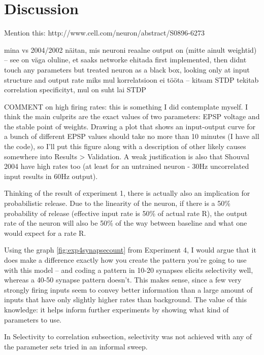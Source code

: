 \documentclass[a4paper,12pt]{report}
\theoremstyle{definition}
\begin{document}
\chapter{Discussion}
Mention this: http://www.cell.com/neuron/abstract/S0896-6273%

mina vs 2004/2002
näitan, mis neuroni reaalne output on (mitte ainult weightid) -- see on väga oluline, et saaks networke ehitada
first implemented, then didnt touch any parameters but treated neuron as a black box, looking only at input structure and output rate
miks mul korrelatsioon ei tööta -- kitsam STDP tekitab correlation specificityt, mul on suht lai STDP

COMMENT on high firing rates: this is something I did contemplate myself. I think the main culprits are the exact values of two parameters: EPSP voltage and the stable point of weights. Drawing a plot that shows an input-output curve for a bunch of different EPSP values should take no more than 10 minutes (I have all the code), so I'll put this figure along with a description of other likely causes somewhere into Results > Validation. A weak justification is also that Shouval 2004 have high rates too (at least for an untrained neuron - 30Hz uncorrelated input results in 60Hz output).

Thinking of the result of experiment 1, there is actually also an implication for probabilistic release. Due to the linearity of the neuron, if there is a 50\% probability of release (effective input rate is 50\% of actual rate R), the output rate of the neuron will also be 50\% of the way between baseline and what one would expect for a rate R.

Using the graph \ref{fig:exp4synapsecount} from Experiment 4, I would argue that it does make a difference exactly how you create the pattern you're going to use with this model -- and coding a pattern in 10-20 synapses elicits selectivity well, whereas a 40-50 synapse pattern doesn't. This makes sense, since a few very strongly firing inputs seem to convey better information than a large amount of inputs that have only slightly higher rates than background.
The value of this knowledge: it helps inform further experiments by showing what kind of parameters to use.

In Selectivity to correlation subsection, selectivity was not achieved with any of the parameter sets tried in an informal sweep.
\end{document}
